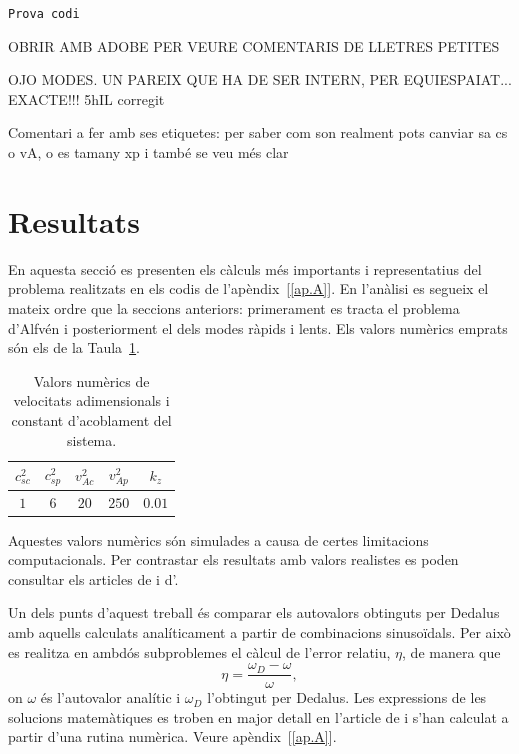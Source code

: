 \documentclass[12pt,a4paper]{article}
\numberwithin{equation}{section}
\begin{document}
\texttt{Prova codi}

OBRIR AMB ADOBE PER VEURE COMENTARIS DE LLETRES PETITES

OJO MODES. UN PAREIX QUE HA DE SER INTERN, PER EQUIESPAIAT... EXACTE!!! 5hIL corregit

Comentari a fer amb ses etiquetes:
per saber com son realment pots canviar sa cs o vA, o es tamany xp i també se veu més clar

\clearpage


\section{Resultats} \label{sec:resultats}
En aquesta secció es presenten els càlculs més importants i representatius del problema realitzats en els codis de l'apèndix~[\ref{ap.A}].
En l'anàlisi es segueix el mateix ordre que la seccions anteriors: primerament es tracta el problema d'Alfvén i posteriorment el dels modes ràpids i lents.
Els valors numèrics emprats són els de la Taula~\ref{tab:valors}.
\begin{table}[H]
    \centering
    \begin{tabular}{|c|c|c|c|c|}
        \hline
        $c_{s c}^2$ & $c_{s p}^2$ & $v_{A c}^2$ & $v_{A p}^2$ & $k_z$ \\
        \hline
        $1$ & $6$ & $20$ & $250$ & $0.01$ \\
        \hline
    \end{tabular}
    \caption{Valors numèrics de velocitats adimensionals i constant d'acoblament del sistema.}
    \label{tab:valors}
\end{table}
\vspace{-10pt}
Aquestes valors numèrics són simulades a causa de certes limitacions computacionals.
Per contrastar els resultats amb valors realistes es poden consultar els articles de \textcite{oscillation_modes_II} i d'\textcite{oscillations_quiescent_solar_prominence}.

Un dels punts d'aquest treball és comparar els autovalors obtinguts per Dedalus amb aquells calculats analíticament a partir de combinacions sinusoïdals. %
Per això es realitza en ambdós subproblemes el càlcul de l'error relatiu, $\eta$, de manera que
\begin{equation}
    \eta = \frac{\omega_D - \omega}{\omega}, \tag{5.1} \label{eq.5.1}
\end{equation}
on $\omega$ és l'autovalor analític i $\omega_D$ l'obtingut per Dedalus.
Les expressions de les solucions matemàtiques es troben en major detall en l'article de \textcite{oscillation_modes_II}
i s'han calculat a partir d'una rutina numèrica. Veure apèndix~[\ref{ap.A}].
\end{document}
